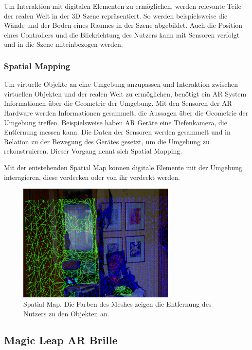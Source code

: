 Um Interaktion mit digitalen Elementen zu ermöglichen, werden relevante Teile der realen Welt in der 3D Szene repräsentiert. 
So werden beispielsweise die Wände und der Boden eines Raumes in der Szene abgebildet. Auch die Position eines Controllers und die Blickrichtung des Nutzers kann mit Sensoren verfolgt und in die Szene miteinbezogen werden.

\subsubsection{Spatial Mapping} 
Um virtuelle Objekte an eine Umgebung anzupassen und Interaktion zwischen virtuellen Objekten und der realen Welt zu ermöglichen, benötigt ein AR System Informationen über die Geometrie der Umgebung. Mit den Sensoren der AR Hardware werden Informationen gesammelt, die Aussagen über die Geometrie der Umgebung treffen. Beispielsweise haben AR Geräte eine Tiefenkamera, die Entfernung messen kann. Die Daten der Sensoren werden gesammelt und in Relation zu der Bewegung des Gerätes gesetzt, um die Umgebung zu rekonstruieren. Dieser Vorgang nennt sich Spatial Mapping. 

Mit der entstehenden Spatial Map können digitale Elemente mit der Umgebung interagieren, diese verdecken oder von ihr verdeckt werden.\citep{spatialMapping} 

\begin{figure}[H]
	\centering
	\includegraphics[width=0.7\textwidth]{images/ML_20201003_15.36.42.jpg}
	\caption[Spatial Mapping]{Spatial Map. Die Farben des Meshes zeigen die Entfernung des Nutzers zu den Objekten an.}
	\label{img:spatialmap}
\end{figure}

\subsection{Magic Leap AR Brille}

